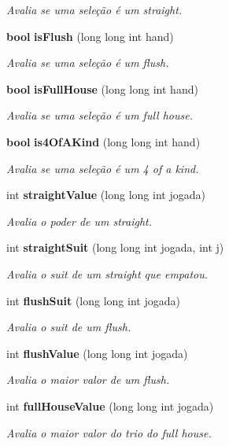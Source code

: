 \begin{DoxyCompactItemize}
\begin{DoxyCompactList}\small\item\em Avalia se uma seleção é um straight. \end{DoxyCompactList}\item 
{\bf bool} {\bf is\+Flush} (long long int hand)
\begin{DoxyCompactList}\small\item\em Avalia se uma seleção é um flush. \end{DoxyCompactList}\item 
{\bf bool} {\bf is\+Full\+House} (long long int hand)
\begin{DoxyCompactList}\small\item\em Avalia se uma seleção é um full house. \end{DoxyCompactList}\item 
{\bf bool} {\bf is4\+Of\+A\+Kind} (long long int hand)
\begin{DoxyCompactList}\small\item\em Avalia se uma seleção é um 4 of a kind. \end{DoxyCompactList}\item 
int {\bf straight\+Value} (long long int jogada)
\begin{DoxyCompactList}\small\item\em Avalia o poder de um straight. \end{DoxyCompactList}\item 
int {\bf straight\+Suit} (long long int jogada, int j)
\begin{DoxyCompactList}\small\item\em Avalia o suit de um straight que empatou. \end{DoxyCompactList}\item 
int {\bf flush\+Suit} (long long int jogada)
\begin{DoxyCompactList}\small\item\em Avalia o suit de um flush. \end{DoxyCompactList}\item 
int {\bf flush\+Value} (long long int jogada)
\begin{DoxyCompactList}\small\item\em Avalia o maior valor de um flush. \end{DoxyCompactList}\item 
int {\bf full\+House\+Value} (long long int jogada)
\begin{DoxyCompactList}\small\item\em Avalia o maior valor do trio do full house. \end{DoxyCompactList}\item 

\end{DoxyCompactItemize}
